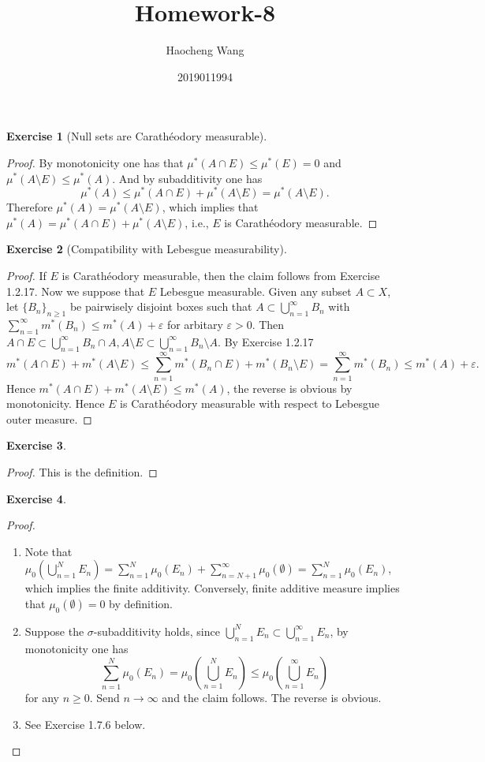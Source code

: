\documentclass[a4paper]{article}
\title{Homework-8}
\author{Haocheng Wang \and 2019011994}
\newtheorem{ex}{Exercise}[subsection]
\begin{document}
\maketitle
\begin{ex}[Null sets are Carath\'eodory measurable]\end{ex}\begin{proof}
By monotonicity one has that $\mu^*(A \cap E) \leq \mu^*(E) = 0$ and $\mu^*(A \setminus E) \leq \mu^*(A)$. And by 
subadditivity one has $$
\mu^*(A) \leq \mu^*(A \cap E) + \mu^*(A \setminus E) = \mu^*(A \setminus E).
$$Therefore $\mu^*(A) = \mu^*(A \setminus E)$, which implies that $\mu^*(A) = \mu^*(A \cap E) + \mu^*(A \setminus E)$,
i.e., $E$ is Carath\'eodory measurable.
\end{proof}

\begin{ex}[Compatibility with Lebesgue measurability]\end{ex}\begin{proof}
If $E$ is Carath\'eodory measurable, then the claim follows from Exercise 1.2.17. Now we suppose that $E$ Lebesgue 
measurable. Given any subset $A \subset X$, let $\{B_n\}_{n \geq 1}$ be pairwisely disjoint boxes such that 
$A \subset \bigcup_{n = 1}^\infty B_n$ with $\sum_{n = 1}^\infty m^*(B_n) \leq m^*(A) + \varepsilon$ for arbitary 
$\varepsilon > 0$. Then $A \cap E \subset \bigcup_{n = 1}^\infty B_n \cap A, A \setminus E \subset \bigcup_{n = 1}^\infty B_n \setminus A$.
By Exercise 1.2.17 $$
m^*(A \cap E) + m^*(A \setminus E) \leq \sum_{n = 1}^\infty m^*(B_n \cap E) + m^*(B_n \setminus E) = \sum_{n = 1}^\infty
m^*(B_n) \leq m^*(A) + \varepsilon.
$$Hence $m^*(A \cap E) + m^*(A \setminus E) \leq m^*(A)$, the reverse is obvious by monotonicity. Hence $E$ is 
Carath\'eodory measurable with respect to Lebesgue outer measure.
\end{proof}

\begin{ex}\end{ex}\begin{proof}
This is the definition.
\end{proof}

\begin{ex}\end{ex}\begin{proof}
\ \begin{enumerate}[label = (\roman*)]
    \item Note that $\mu_0(\bigcup_{n = 1}^N E_n) = \sum_{n = 1}^N \mu_0(E_n) + \sum_{n = N + 1}^\infty \mu_0(\emptyset) 
    = \sum_{n = 1}^N \mu_0(E_n)$, which implies the finite additivity. Conversely, finite additive measure implies 
    that $\mu_0(\emptyset) = 0$ by definition.
    \item Suppose the $\sigma$-subadditivity holds, since $\bigcup_{n = 1}^N E_n \subset \bigcup_{n = 1}^\infty E_n$, 
    by monotonicity one has $$\sum_{n = 1}^N \mu_0(E_n) = \mu_0(\bigcup_{n = 1}^N E_n) \leq \mu_0(\bigcup_{n = 1}^\infty E_n)$$
    for any $n \geq 0$. Send $n \to \infty$ and the claim follows. The reverse is obvious.
    \item See Exercise 1.7.6 below.
\end{enumerate}
\end{proof}
\end{document}
